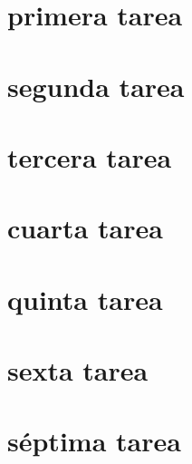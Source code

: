 \chapter{primera tarea}
    
\chapter{segunda tarea}
    
\chapter{tercera tarea}
    
\chapter{cuarta tarea}
    
\chapter{quinta tarea}
    
\chapter{sexta tarea}
    
\chapter{séptima tarea}
    